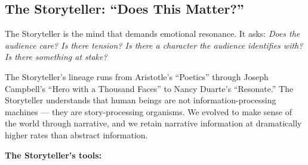 \subsection{The Storyteller: ``Does This Matter?''}

The Storyteller is the mind that demands emotional resonance. It asks: \emph{Does the audience care? Is there tension? Is there a character the audience identifies with? Is there something at stake?}

The Storyteller's lineage runs from Aristotle's ``Poetics'' through Joseph Campbell's ``Hero with a Thousand Faces'' to Nancy Duarte's ``Resonate.'' The Storyteller understands that human beings are not information-processing machines --- they are story-processing organisms. We evolved to make sense of the world through narrative, and we retain narrative information at dramatically higher rates than abstract information.

\textbf{The Storyteller's tools:}

